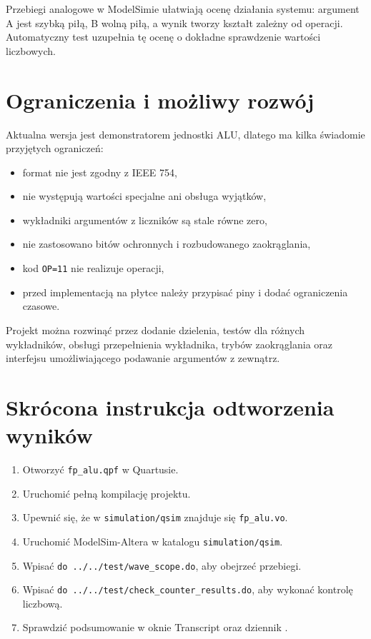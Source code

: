 \documentclass[12pt,a4paper]{article}
\begin{document}
Przebiegi analogowe w ModelSimie ułatwiają ocenę działania systemu:
argument A jest szybką piłą, B wolną piłą, a wynik tworzy kształt zależny
od operacji. Automatyczny test uzupełnia tę ocenę o dokładne sprawdzenie
wartości liczbowych.

\section{Ograniczenia i możliwy rozwój}

Aktualna wersja jest demonstratorem jednostki ALU, dlatego ma kilka świadomie
przyjętych ograniczeń:

\begin{itemize}
    \item format nie jest zgodny z IEEE 754,
    \item nie występują wartości specjalne ani obsługa wyjątków,
    \item wykładniki argumentów z liczników są stale równe zero,
    \item nie zastosowano bitów ochronnych i rozbudowanego zaokrąglania,
    \item kod \texttt{OP=11} nie realizuje operacji,
    \item przed implementacją na płytce należy przypisać piny i dodać
          ograniczenia czasowe.
\end{itemize}

Projekt można rozwinąć przez dodanie dzielenia, testów dla różnych
wykładników, obsługi przepełnienia wykładnika, trybów zaokrąglania oraz
interfejsu umożliwiającego podawanie argumentów z zewnątrz.

\section{Skrócona instrukcja odtworzenia wyników}

\begin{enumerate}
    \item Otworzyć \texttt{fp\_alu.qpf} w Quartusie.
    \item Uruchomić pełną kompilację projektu.
    \item Upewnić się, że w \texttt{simulation/qsim} znajduje się
          \texttt{fp\_alu.vo}.
    \item Uruchomić ModelSim-Altera w katalogu \texttt{simulation/qsim}.
    \item Wpisać \texttt{do ../../test/wave\_scope.do}, aby obejrzeć
          przebiegi.
    \item Wpisać \texttt{do ../../test/check\_counter\_results.do}, aby
          wykonać kontrolę liczbową.
    \item Sprawdzić podsumowanie w oknie Transcript oraz dziennik
          .
\end{enumerate}
\end{document}
